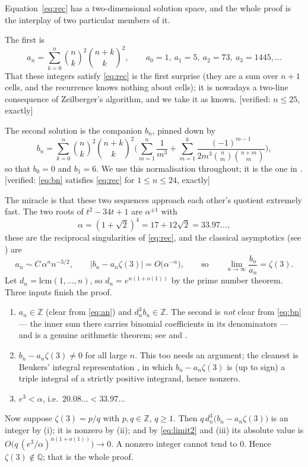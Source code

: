 \documentclass[11pt,reqno]{amsart}
\theoremstyle{plain}
\theoremstyle{definition}
\theoremstyle{remark}
\newcommand{\Z}{\mathbb{Z}}
\newcommand{\Q}{\mathbb{Q}}
\newcommand{\Ver}[1]{\textup{\textsf{[verified: #1]}}}
\numberwithin{equation}{section}
\begin{document}
Equation~\eqref{eq:rec} has a two-dimensional solution space, and the whole
proof is the interplay of two particular members of it.

The first is
\begin{equation}\label{eq:an}
  a_n=\sum_{k=0}^{n}\binom{n}{k}^{2}\binom{n+k}{k}^{2},
  \qquad a_0=1,\ a_1=5,\ a_2=73,\ a_3=1445,\dots
\end{equation}
That these integers satisfy \eqref{eq:rec} is the first surprise (they are a
sum over $n+1$ cells, and the recurrence knows nothing about cells); it is
nowadays a two-line consequence of Zeilberger's algorithm, and we take it as
known. \Ver{$n\le 25$, exactly}

The second solution is the companion $b_n$, pinned down by
\begin{equation}\label{eq:bn}
  b_n=\sum_{k=0}^{n}\binom{n}{k}^{2}\binom{n+k}{k}^{2}
      \Biggl(\sum_{m=1}^{n}\frac{1}{m^3}
      +\sum_{m=1}^{k}\frac{(-1)^{m-1}}
        {2m^3\binom{n}{m}\binom{n+m}{m}}\Biggr),
\end{equation}
so that $b_0=0$ and $b_1=6$. We use this normalisation throughout; it is the
one in \cite{vdP}. \Ver{\eqref{eq:bn} satisfies \eqref{eq:rec} for
$1\le n\le 24$, exactly}

The miracle is that these two sequences approach each other's quotient
extremely fast. The two roots of $t^2-34t+1$ are $\alpha^{\pm1}$ with
\begin{equation}\label{eq:limit}
  \alpha=(1+\sqrt2)^4=17+12\sqrt2=33.97\ldots,
\end{equation}
these are the reciprocal singularities of \eqref{eq:rec}, and the classical
asymptotics (see \cite{vdP,Beukers79}) are
\begin{equation}\label{eq:limit2}
  a_n\sim C\,\alpha^{n}n^{-3/2},
  \qquad
  \bigl|b_n-a_n\zeta(3)\bigr|=O\bigl(\alpha^{-n}\bigr),
  \qquad\text{so}\qquad
  \lim_{n\to\infty}\frac{b_n}{a_n}=\zeta(3).
\end{equation}
Let $d_n=\mathrm{lcm}(1,\dots,n)$, so $d_n=e^{n(1+o(1))}$ by the prime number
theorem. Three inputs finish the proof.
\begin{enumerate}[label=\textup{(\roman*)},leftmargin=2.4em]
\item $a_n\in\Z$ (clear from \eqref{eq:an}) and $d_n^{3}b_n\in\Z$. The second
  is \emph{not} clear from \eqref{eq:bn} --- the inner sum there carries
  binomial coefficients in its denominators --- and is a genuine arithmetic
  theorem; see \cite[\S3]{vdP} and \cite{Beukers79}.
\item $b_n-a_n\zeta(3)\ne0$ for all large $n$. This too needs an argument; the
  cleanest is Beukers' integral representation \cite{Beukers79}, in which
  $b_n-a_n\zeta(3)$ is (up to sign) a triple integral of a strictly positive
  integrand, hence nonzero.
\item $e^{3}<\alpha$, i.e.\ $20.08\ldots<33.97\ldots$
\end{enumerate}
Now suppose $\zeta(3)=p/q$ with $p,q\in\Z$, $q\ge1$. Then
$q\,d_n^{3}\bigl(b_n-a_n\zeta(3)\bigr)$ is an integer by (i); it is nonzero by
(ii); and by \eqref{eq:limit2} and (iii) its absolute value is
$O\bigl(q\,(e^{3}/\alpha)^{n(1+o(1))}\bigr)\to0$. A nonzero integer cannot tend
to $0$. Hence $\zeta(3)\notin\Q$; that is the whole proof.
\end{document}
